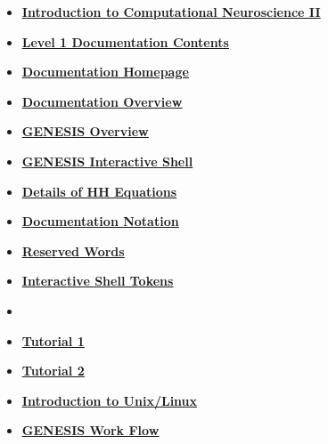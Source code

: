 \documentclass[12pt]{article}
\begin{document}
\begin{itemize}
\item \href{../compneurosci-2/compneurosci-2.pdf}{\bf \underline{Introduction to Computational Neuroscience II}}

\item \href{../contents-level1/contents-level1.pdf}{\bf \underline{Level 1 Documentation Contents}}

\item \href{../documentation-homepage/documentation-homepage.pdf}{\bf \underline{Documentation Homepage}}

\item \href{../documentation-overview/documentation-overview.pdf}{\bf \underline{Documentation Overview}}

\item \href{../genesis-overview/genesis-overview.pdf}{\bf \underline{GENESIS Overview}}

\item \href{../gshell/gshell.pdf}{\bf \underline{GENESIS Interactive Shell}}

\item \href{../hh-model-details/hh-model-details.pdf}{\bf \underline{Details of HH Equations}}

\item \href{../notation/notation.pdf}{\bf \underline{Documentation Notation}}

\item \href{../reserved-words/reserved-words.pdf}{\bf \underline{Reserved Words}}

\item \href{../shell-tokens/shell-tokens.pdf}{\bf \underline{Interactive Shell Tokens}}

\item \href{../tutorial-jaeger/tutorial-jaeger.pdf}{\bf \underline{}}

\item \href{../tutorial1/tutorial1.pdf}{\bf \underline{Tutorial 1}}

\item \href{../tutorial2/tutorial2.pdf}{\bf \underline{Tutorial 2}}

\item \href{../unix-linux/unix-linux.pdf}{\bf \underline{Introduction to Unix/Linux}}

\item \href{../work-flow/work-flow.pdf}{\bf \underline{GENESIS Work Flow}}


\end{itemize}

\end{document}
